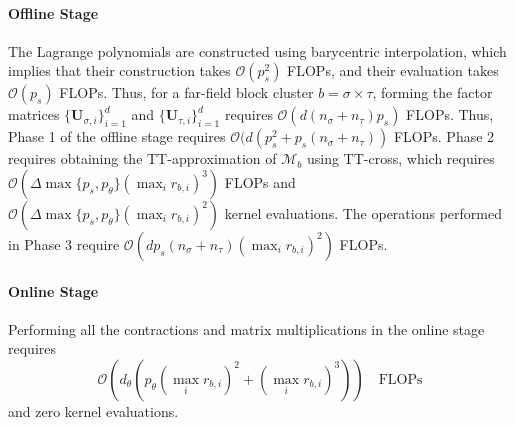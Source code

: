 \documentclass[final,3p,times]{elsarticle}
\newcommand{\mc}[1]{\mathcal{#1}}
\newcommand{\mat}[1]{\boldsymbol{#1}}
\newcommand{\ten}[1]{\boldsymbol{\mathcal{#1}}}
\begin{document}
\paragraph{Offline Stage} 



The Lagrange polynomials are constructed  using barycentric interpolation, which implies that their construction takes $\mc{O}(p_s^2)$ FLOPs, and their evaluation takes $\mc{O}(p_s)$ FLOPs. Thus, for a far-field block cluster $b = \sigma \times \tau $, forming the factor matrices $\{\mat{U}_{\sigma, i} \}_{i=1}^{d}$ and $\{\mat{U}_{\tau, i} \}_{i=1}^{d}$ requires $\mc{O}(d(n_{\sigma} + n_{\tau})p_s)$ FLOPs. Thus,  Phase 1 of the offline stage requires $\mc{O}(d(p_s^2 + p_s(n_\sigma + n_{\tau}))$ FLOPs. Phase 2 requires obtaining the TT-approximation of $\ten{M}_{b}$ using TT-cross, which requires $\mc{O}(\Delta\max\{p_s, p_\theta \} (\max_{i}r_{b,i})^3 )$ FLOPs and $\mc{O}(\Delta\max\{p_s, p_\theta \} (\max_{i}r_{b,i})^2 )$ kernel evaluations. The operations performed in Phase 3 require $\mc{O}(dp_s(n_\sigma + n_\tau)(\max_{i}r_{b,i})^2)$ FLOPs.

\paragraph{Online Stage}
Performing all the contractions and matrix multiplications in the online stage requires $$\mc{O}(d_\theta (p_{\theta} (\max_{i}r_{b,i})^2 + (\max_{i}r_{b,i})^3)) \quad \text{FLOPs}$$
and zero kernel evaluations. 
\end{document}
